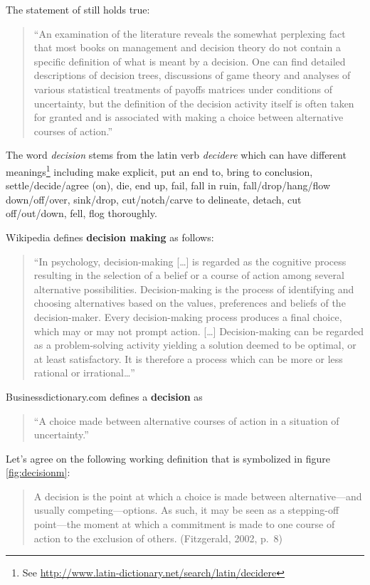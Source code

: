 \documentclass[
  12pt,
  oneside]{book}
\theoremstyle{definition}
\theoremstyle{definition}
\theoremstyle{definition}
\theoremstyle{definition}
\theoremstyle{remark}
\begin{document}
The statement of \citet{Eilon1969What} still holds true:

\begin{quote}
``An examination of the literature reveals the somewhat perplexing fact that most books on management and decision theory do not contain a specific definition of what is meant by a decision. One can find detailed descriptions of decision trees, discussions of game theory and analyses of various statistical treatments of payoffs matrices under conditions of uncertainty, but the definition of the decision activity itself is often taken for granted and is associated with making a choice between alternative courses of action.''
\end{quote}

The word \emph{decision} stems from the latin verb \emph{decidere} which can have different meanings\footnote{See \url{http://www.latin-dictionary.net/search/latin/decidere}} including make explicit, put an end to, bring to conclusion, settle/decide/agree (on), die, end up, fail, fall in ruin, fall/drop/hang/flow down/off/over, sink/drop, cut/notch/carve to delineate, detach, cut off/out/down, fell, flog thoroughly.

Wikipedia defines \textbf{decision making} as follows:

\begin{quote}
``In psychology, decision-making {[}\ldots{]} is regarded as the cognitive process resulting in the selection of a belief or a course of action among several alternative possibilities. Decision-making is the process of identifying and choosing alternatives based on the values, preferences and beliefs of the decision-maker. Every decision-making process produces a final choice, which may or may not prompt action. {[}\ldots{]} Decision-making can be regarded as a problem-solving activity yielding a solution deemed to be optimal, or at least satisfactory. It is therefore a process which can be more or less rational or irrational\ldots{}''
\end{quote}

Businessdictionary.com defines a \textbf{decision} as

\begin{quote}
``A choice made between alternative courses of action in a situation of uncertainty.''
\end{quote}

Let's agree on the following working definition that is symbolized in figure \ref{fig:decisionm}:

\begin{quote}
A decision is the point at which a choice is made between alternative---and usually competing---options. As such, it may be seen as a stepping-off point---the moment at which a commitment is made to one course of action to the exclusion of others. (Fitzgerald, 2002, p.~8)
\end{quote}
\end{document}
